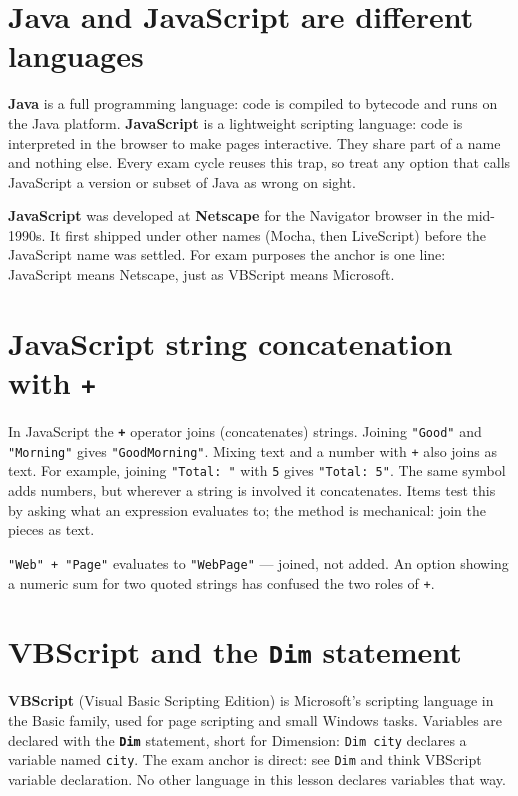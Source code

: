 \section{Java and JavaScript are different languages}
\textbf{Java} is a full programming language: code is compiled to bytecode and runs on the Java platform. \textbf{JavaScript} is a lightweight scripting language: code is interpreted in the browser to make pages interactive. They share part of a name and nothing else. Every exam cycle reuses this trap, so treat any option that calls JavaScript a version or subset of Java as wrong on sight.

\textbf{JavaScript} was developed at \textbf{Netscape} for the Navigator browser in the mid-1990s. It first shipped under other names (Mocha, then LiveScript) before the JavaScript name was settled. For exam purposes the anchor is one line: JavaScript means Netscape, just as VBScript means Microsoft.

\section{JavaScript string concatenation with \texttt{+}}
In JavaScript the \textbf{\texttt{+}} operator joins (concatenates) strings. Joining \texttt{"Good"} and \texttt{"Morning"} gives \texttt{"GoodMorning"}. Mixing text and a number with \texttt{+} also joins as text. For example, joining \texttt{"Total: "} with \texttt{5} gives \texttt{"Total: 5"}. The same symbol adds numbers, but wherever a string is involved it concatenates. Items test this by asking what an expression evaluates to; the method is mechanical: join the pieces as text.

\begin{example}
\texttt{"Web" + "Page"} evaluates to \texttt{"WebPage"} --- joined, not added. An option showing a numeric sum for two quoted strings has confused the two roles of \texttt{+}.
\end{example}

\section{VBScript and the \texttt{Dim} statement}
\textbf{VBScript} (Visual Basic Scripting Edition) is Microsoft's scripting language in the Basic family, used for page scripting and small Windows tasks. Variables are declared with the \textbf{\texttt{Dim}} statement, short for Dimension: \texttt{Dim city} declares a variable named \texttt{city}. The exam anchor is direct: see \texttt{Dim} and think VBScript variable declaration. No other language in this lesson declares variables that way.

